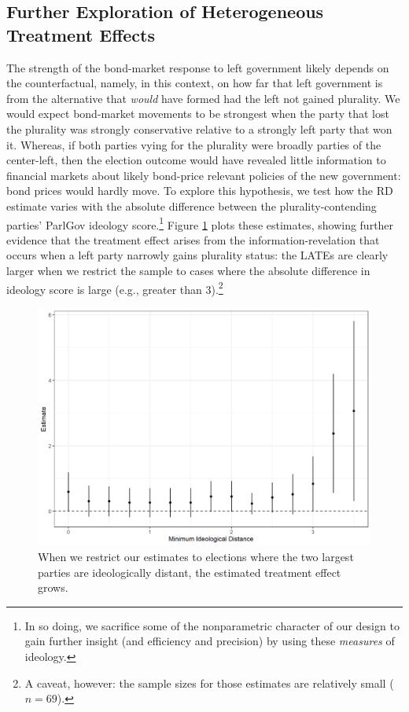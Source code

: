 \documentclass[12pt]{article}
\begin{document}
\subsection{Further Exploration of Heterogeneous Treatment Effects}

The strength of the bond-market response to left government likely depends on the counterfactual, namely, in this context, on how far that left government is from the alternative that \textit{would} have formed had the left not gained plurality. We would expect bond-market movements to be strongest when the party that lost the plurality was strongly conservative relative to a strongly left party that won it. Whereas, if both parties vying for the plurality were broadly parties of the center-left, then the election outcome would have revealed little information to financial markets about likely bond-price relevant policies of the new government: bond prices would hardly move. To explore this hypothesis, we test how the RD estimate varies with the absolute difference between the plurality-contending parties' ParlGov ideology score.\footnote{In so doing, we sacrifice some of the nonparametric character of our design to gain further insight (and efficiency and precision) by using these \textit{measures} of ideology.} Figure \ref{fig:rdEstimateVaryingIdeologyDistance} plots these estimates, showing further evidence that the treatment effect arises from the information-revelation that occurs when a left party narrowly gains plurality status: the LATEs are clearly larger when we restrict the sample to cases where the absolute difference in ideology score is large (e.g., greater than 3).\footnote{A caveat, however: the sample sizes for those estimates are relatively small ($n = 69$).}

\begin{figure}[h]
	\centering
	\includegraphics[width=\linewidth]{figures/Figure5.png}
	\caption{When we restrict our estimates to elections where the two largest parties are ideologically distant, the estimated treatment effect grows.}
	\label{fig:rdEstimateVaryingIdeologyDistance}
\end{figure}
\end{document}

